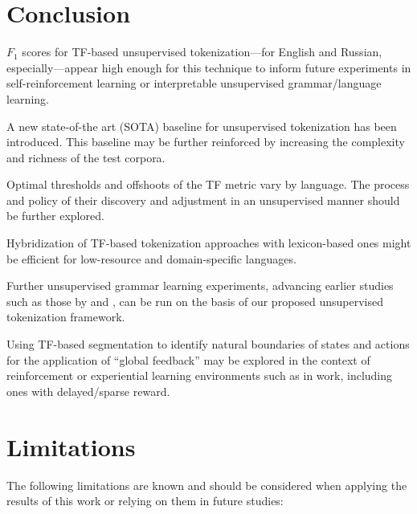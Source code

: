 \documentclass[11pt]{article}
\begin{document}
\section{Conclusion}

$F_1$ scores for TF-based unsupervised tokenization—for English and Russian, especially—appear high enough for this technique to inform future experiments in self-reinforcement learning or interpretable unsupervised grammar/language learning.

A new state-of-the art (SOTA) baseline for unsupervised tokenization has been introduced. This baseline may be further reinforced by increasing the complexity and richness of the test corpora.

Optimal thresholds and offshoots of the TF metric vary by language. The process and policy of their discovery and adjustment in an unsupervised manner should be further explored.

Hybridization of TF-based tokenization approaches with lexicon-based ones might be efficient for low-resource and domain-specific languages.

Further unsupervised grammar learning experiments, advancing earlier studies such as those by \citet{5} and \citet{6}, can be run on the basis of our proposed unsupervised tokenization framework. 

Using TF-based segmentation to identify natural boundaries of states and actions for the application of “global feedback” may be explored in the context of reinforcement or experiential learning environments such as in  work, including ones with delayed/sparse reward.

\section*{Limitations}

The following limitations are known and should be considered when applying the results of this work or relying on them in future studies:
\end{document}
